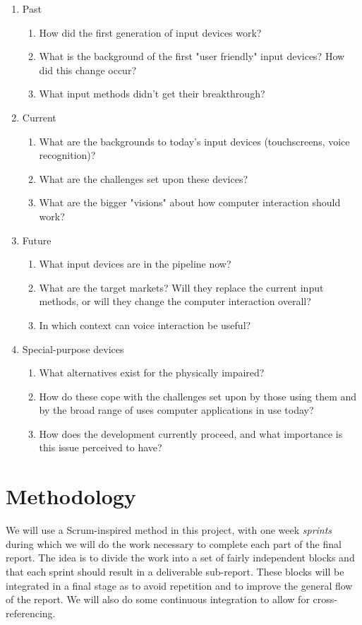 \documentclass[a4paper,10pt]{article}
\begin{document}
\begin{enumerate}
	\item
	Past
	\begin{enumerate}[I]
		\item How did the first generation of input devices work?
		\item What is the background of the first "user friendly" input devices? How did this change occur?
		\item What input methods didn't get their breakthrough?
	\end{enumerate}

	\item
	Current
	\begin{enumerate}[I]
		\item What are the backgrounds to today’s input devices (touchscreens, voice recognition)?
		\item What are the challenges set upon these devices?
		\item What are the bigger "visions" about how computer interaction should work?
	\end{enumerate}

	\item
	Future
	\begin{enumerate}[I]
		\item What input devices are in the pipeline now?
		\item What are the target markets? Will they replace the current input methods, or will they change the computer 	interaction overall?
		\item In which context can voice interaction be useful?
	\end{enumerate}

	\item
	Special-purpose devices
	\begin{enumerate}[I]
		\item
		What alternatives exist for the physically impaired?
		\item
		How do these cope with the challenges set upon by those using them and by the broad range of uses computer applications in use today?
		\item
		How does the development currently proceed, and what importance is this issue perceived to have?
	\end{enumerate}
\end{enumerate}

\section{Methodology}
\label{sec:method}
We will use a Scrum-inspired\cite{scrum} method in this project, with one week \emph{sprints} during which we will do the work necessary to complete each part of the final report. The idea is to divide the work into a set of fairly independent blocks and that each sprint should result in a deliverable sub-report. These blocks will be integrated in a final stage as to avoid repetition and to improve the general flow of the report. We will also do some continuous integration to allow for cross-referencing.
\end{document}
